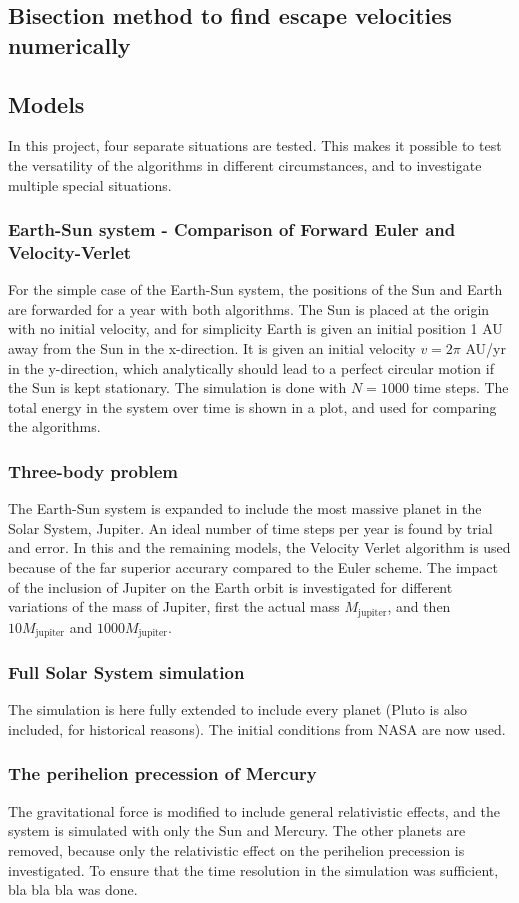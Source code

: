 \documentclass[aps,reprint]{revtex4-1}
\begin{document}
\subsection{Bisection method to find escape velocities numerically}

\subsection{Models}
In this project, four separate situations are tested. This makes it possible to test the versatility of the
algorithms in different circumstances, and to investigate multiple special situations.
\subsubsection{Earth-Sun system - Comparison of Forward Euler and Velocity-Verlet}
\label{seq:earthsunmethod}
For the simple case of the Earth-Sun system, the positions of the Sun and Earth are
forwarded for a year with both algorithms. The Sun is placed at the origin with
no initial velocity, and for simplicity Earth is given an initial position 1 AU
away from the Sun in the x-direction. It is given an initial velocity $v = 2\pi$ AU/yr
in the y-direction, which analytically should lead to a perfect circular motion
if the Sun is kept stationary. The simulation is done with $N = 1000$ time steps.
The total energy in the system over time is shown in a plot, and used for
comparing the algorithms.
\subsubsection{Three-body problem}
The Earth-Sun system is expanded to include the most massive planet in the Solar System, Jupiter.
An ideal number of time steps per year is found by trial and error. In this and the remaining models, the Velocity
Verlet algorithm is used because of the far superior accurary compared to the
Euler scheme. The impact of the inclusion of Jupiter on the Earth orbit is investigated
for different variations of the mass of Jupiter, first the actual mass $M_\text{jupiter}$,
and then $10 M_\text{jupiter}$ and $1000 M_\text{jupiter}$.
\subsubsection{Full Solar System simulation}
The simulation is here fully extended to include every planet (Pluto is also included,
for historical reasons). The initial
conditions from NASA are now used.
\subsubsection{The perihelion precession of Mercury}
The gravitational force is modified to include general relativistic effects, and
the system is simulated with only the Sun and Mercury. The other planets are removed,
because only the relativistic effect on the perihelion precession is investigated.
To ensure that the time resolution in the simulation was sufficient, bla bla bla
was done.
\end{document}
